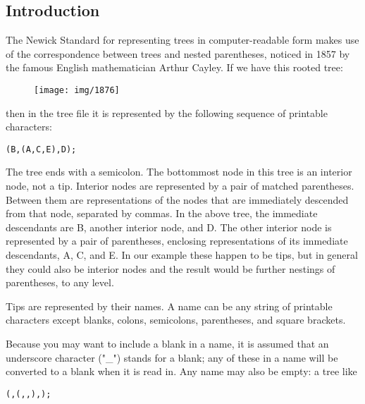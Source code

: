 \renewcommand{\thesubsection}{}

\hypertarget{introduction}{%
\subsection*{Introduction}\label{introduction}}

The Newick Standard for representing trees in computer-readable form
makes use of the correspondence between trees and nested parentheses,
noticed in 1857 by the famous English mathematician
Arthur
Cayley. If we have this rooted tree:

\begin{figure}[!hbt]
	\begin{center}
		\texttt{[image: img/1876]}
		\label{fig:nw}
	\end{center}
\end{figure}

then in the tree file it is represented by the following sequence of
printable characters:

\bigskip

\texttt{(B,(A,C,E),D);}

\bigskip

The tree ends with a semicolon. The bottommost node in this tree is an
interior node, not a tip. Interior nodes are represented by a pair of
matched parentheses. Between them are representations of the nodes that
are immediately descended from that node, separated by commas. In the
above tree, the immediate descendants are B, another interior node, and
D. The other interior node is represented by a pair of parentheses,
enclosing representations of its immediate descendants, A, C, and E. In
our example these happen to be tips, but in general they could also be
interior nodes and the result would be further nestings of parentheses,
to any level.

\bigskip

Tips are represented by their names. A name can be any string of
printable characters except blanks, colons, semicolons, parentheses, and
square brackets.

\bigskip

Because you may want to include a blank in a name, it is assumed that an
underscore character ("\_") stands for a blank; any of these in a name
will be converted to a blank when it is read in. Any name may also be
empty: a tree like

\bigskip

\texttt{(,(,,),);}

